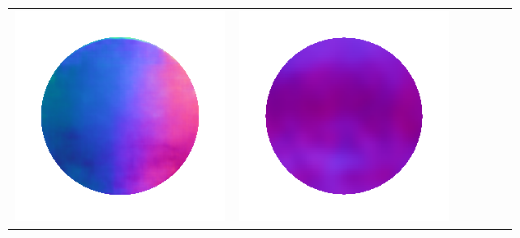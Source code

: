 \begin{tabularx}{\linewidth}{@{}Y@{}Y@{}Y@{}Y@{}Y@{}Y@{}}
\includegraphics[width=\linewidth]{semisynthetic/20160617_13_marrnet_out.png} &
\includegraphics[width=\linewidth]{semisynthetic/20160617_13_ef_out.png} \\

\end{tabularx}
